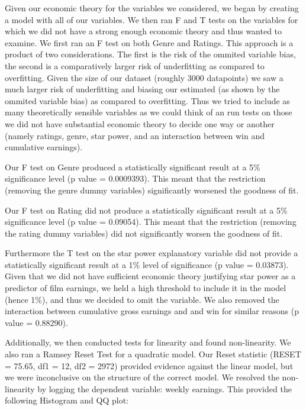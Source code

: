 \documentclass[11pt]{article} %
\begin{document}
Given our economic theory for the variables we considered, we began by creating a model with all of our variables. We then ran F and T tests on the variables for which we did not have a strong enough economic theory and thus wanted to examine. We first ran an F test on both Genre and Ratings. This approach is a product of two considerations. The first is the risk of the ommited variable bias, the second is a comparatively larger risk of underfitting as compared to overfitting. Given the size of our dataset (roughly 3000 datapoints) we saw a much larger risk of underfitting and biasing our estimated (as shown by the ommited variable bias) as compared to overfitting. Thus we tried to include as many theoretically sensible variables as we could think of an run tests on those we did not have substantial economic theory to decide one way or another (namely ratings, genre, star power, and an interaction between win and cumulative earnings). 

Our F test on Genre produced a statistically significant result at a 5\% significance level (p value = 0.0009393). This meant that the restriction (removing the genre dummy variables) significantly worsened the goodness of fit. 

Our F test on Rating did not produce a statistically significant result at a 5\% significance level (p value = 0.09054). This meant that the restriction (removing the rating dummy variables) did not significantly worsen the goodness of fit. 

Furthermore the T test on the star power explanatory variable did not provide a statistically significant result at a 1\% level of significance (p value = 0.03873). Given that we did not have sufficient economic theory justifying star power as a predictor of film earnings, we held a high threshold to include it in the model (hence 1\%), and thus we decided to omit the variable. We also removed the interaction between cumulative gross earnings and and win for similar reasons (p value = 0.88290).

Additionally, we then conducted tests for linearity and found non-linearity. We also ran a Ramsey Reset Test for a quadratic model. Our Reset statistic (RESET = 75.65, df1 = 12, df2 = 2972) provided evidence against the linear model, but we were inconclusive on the structure of the correct model. We resolved the non-linearity by logging the dependent variable: weekly earnings. This provided the following Histogram and QQ plot: 

\begin{figure} [h]
    \centering
    \qquad
    \label{fig:example}%
\end{figure}
\end{document}
